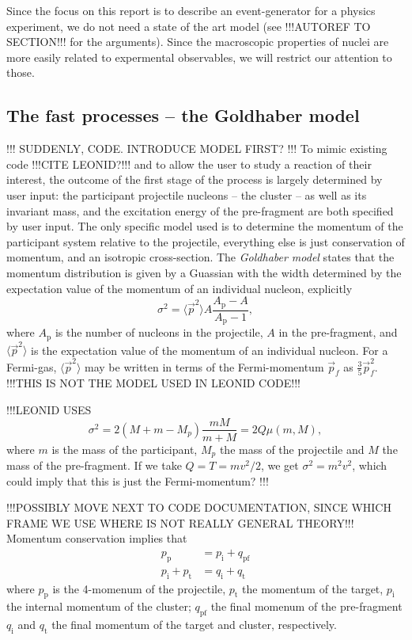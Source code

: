 Since the focus on this report is to describe an event-generator for a physics experiment, we do not need a state of the art model (see !!!AUTOREF TO SECTION!!! for the arguments). Since the macroscopic properties of nuclei are more easily related to expermental observables, we will restrict our attention to those. 

\subsection{The fast processes -- the Goldhaber model}
!!! SUDDENLY, CODE. INTRODUCE MODEL FIRST? !!!
To mimic existing code !!!CITE LEONID?!!! and to allow the user to study a reaction of their interest, the outcome of the first stage of the process is largely determined by user input: the participant projectile nucleons -- the cluster -- as well as its invariant mass, and the excitation energy of the pre-fragment are both specified by user input. The only specific model used is to determine the momentum of the participant system relative to the projectile, everything else is just conservation of momentum, and an isotropic cross-section. 
The \emph{Goldhaber model} states that the momentum distribution is given by a Guassian with the width determined by the expectation value of the momentum of an individual nucleon, explicitly
\begin{equation}
\sigma^2 = \langle \vec{p}^2 \rangle A\frac{A_\text{p}-A}{A_\text{p}-1},
\end{equation}
where $A_\text{p}$ is the number of nucleons in the projectile, $A$ in the pre-fragment, and $\langle \vec{p}^2 \rangle$ is the expectation value of the momentum of an individual nucleon. For a Fermi-gas, $\langle \vec{p}^2 \rangle$ may be written in terms of the Fermi-momentum $\vec{p}_f$ as $\tfrac{3}{5} \vec{p}_f^2$\cite{goldhaber:1974:art}.
!!!THIS IS NOT THE MODEL USED IN LEONID CODE!!!


!!!LEONID USES
\begin{equation*}
\sigma^2 = 2 (M + m -M_p) \frac{mM}{m+M} = 2 Q \mu(m,M),
\end{equation*}
where $m$ is the mass of the participant, $M_p$ the mass of the projectile and $M$ the mass of the pre-fragment. If we take $Q=T = m v^2/2$, we get $\sigma^2 = m^2 v^2$, which could imply that this is just the Fermi-momentum?
!!!

!!!POSSIBLY MOVE NEXT TO CODE DOCUMENTATION, SINCE WHICH FRAME WE USE WHERE IS NOT REALLY GENERAL THEORY!!!
Momentum conservation implies that
\begin{align}
p_\text{p} &= p_\text{i} + q_\text{pf} \\
p_\text{i} + p_\text{t} &= q_\text{i} + q_\text{t}
\end{align}
where $p_\text{p}$ is the 4-momenum of the projectile, $p_\text{t}$ the momentum of the target, $p_\text{i}$ the internal momentum of the cluster; $q_\text{pf}$ the final momenum of the pre-fragment $q_\text{i}$ and $q_\text{t}$ the final momentum of the target and cluster, respectively.

